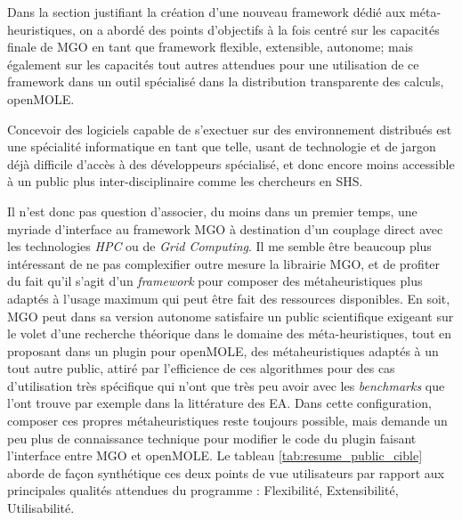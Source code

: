 Dans la section justifiant la création d'une nouveau framework dédié aux méta-heuristiques, on a abordé des points d'objectifs à la fois centré sur les capacités finale de MGO en tant que framework flexible, extensible, autonome; mais également sur les capacités tout autres attendues pour une utilisation de ce framework dans un outil spécialisé dans la distribution transparente des calculs, openMOLE.

Concevoir des logiciels capable de s'exectuer sur des environnement distribués est une spécialité informatique en tant que telle, usant de technologie et de jargon déjà difficile d'accès à des développeurs spécialisé, et donc encore moins accessible à un public plus inter-disciplinaire comme les chercheurs en SHS.

Il n'est donc pas question d'associer, du moins dans un premier temps, une myriade d'interface au framework MGO à destination d'un couplage direct avec les technologies \textit{HPC} ou de \textit{Grid Computing}. Il me semble être beaucoup plus intéressant de ne pas complexifier outre mesure la librairie MGO, et de profiter du fait qu'il s'agit d'un \textit{framework} pour composer des métaheuristiques plus adaptés à l'usage maximum qui peut être fait des ressources disponibles. En soit, MGO peut dans sa version autonome satisfaire un public scientifique exigeant sur le volet d'une recherche théorique dans le domaine des méta-heuristiques, tout en proposant dans un plugin pour openMOLE, des métaheuristiques adaptés à un tout autre public, attiré par l'efficience de ces algorithmes pour des cas d'utilisation très spécifique qui n'ont que très peu avoir avec les \textit{benchmarks} que l'ont trouve par exemple dans la littérature des EA. Dans cette configuration, composer ces propres métaheuristiques reste toujours possible, mais demande un peu plus de connaissance technique pour modifier le code du plugin faisant l'interface entre MGO et openMOLE. Le tableau \ref{tab:resume_public_cible} aborde de façon synthétique ces deux points de vue utilisateurs par rapport aux principales qualités attendues du programme : Flexibilité, Extensibilité, Utilisabilité.


